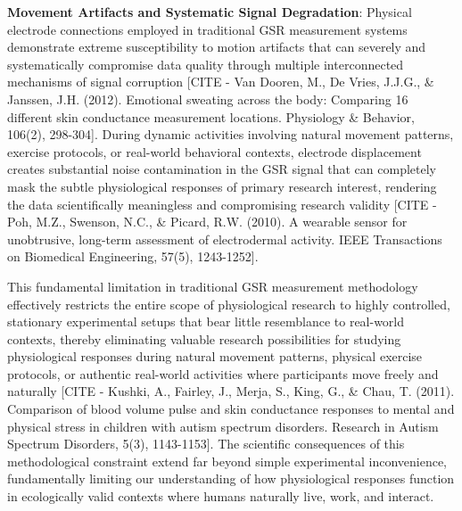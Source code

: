 \documentclass[11pt,a4paper]{report}
\begin{document}
\textbf{Movement Artifacts and Systematic Signal Degradation}: Physical electrode connections employed in traditional GSR
measurement systems demonstrate extreme susceptibility to motion artifacts that can severely and systematically
compromise data quality through multiple interconnected mechanisms of signal
corruption [CITE - Van Dooren, M., De Vries, J.J.G., \& Janssen, J.H. (2012). Emotional sweating across the body: Comparing 16 different skin conductance measurement locations. Physiology \& Behavior, 106(2), 298-304].
During dynamic activities involving natural movement patterns, exercise protocols, or real-world behavioral contexts,
electrode displacement creates substantial noise contamination in the GSR signal that can completely mask the subtle
physiological responses of primary research interest, rendering the data scientifically meaningless and compromising
research
validity [CITE - Poh, M.Z., Swenson, N.C., \& Picard, R.W. (2010). A wearable sensor for unobtrusive, long-term assessment of electrodermal activity. IEEE Transactions on Biomedical Engineering, 57(5), 1243-1252].

This fundamental limitation in traditional GSR measurement methodology effectively restricts the entire scope of
physiological research to highly controlled, stationary experimental setups that bear little resemblance to real-world
contexts, thereby eliminating valuable research possibilities for studying physiological responses during natural
movement patterns, physical exercise protocols, or authentic real-world activities where participants move freely and
naturally [CITE - Kushki, A., Fairley, J., Merja, S., King, G., \& Chau, T. (2011). Comparison of blood volume pulse and skin conductance responses to mental and physical stress in children with autism spectrum disorders. Research in Autism Spectrum Disorders, 5(3), 1143-1153].
The scientific consequences of this methodological constraint extend far beyond simple experimental inconvenience,
fundamentally limiting our understanding of how physiological responses function in ecologically valid contexts where
humans naturally live, work, and interact.
\end{document}

